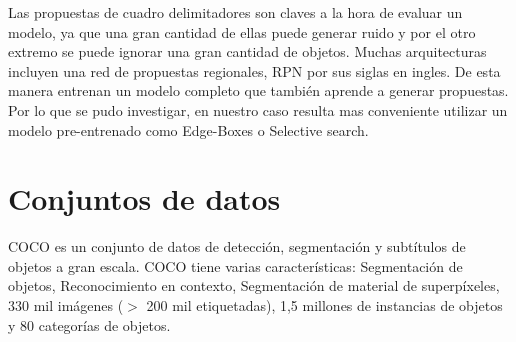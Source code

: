 Las propuestas de cuadro delimitadores son claves a la hora de evaluar un modelo, ya que una gran cantidad de ellas puede generar ruido y por el otro extremo se puede ignorar una gran cantidad de objetos.  Muchas arquitecturas incluyen una red de propuestas regionales, RPN por sus siglas en ingles. De esta manera entrenan un modelo completo que también aprende a generar propuestas. Por lo que se pudo investigar, en nuestro caso resulta mas conveniente utilizar un modelo pre-entrenado como Edge-Boxes o Selective search.

\section{Conjuntos de datos}
COCO es un conjunto de datos de detección, segmentación y subtítulos de objetos a gran escala. COCO tiene varias características: Segmentación de objetos,  Reconocimiento en contexto,  Segmentación de material de superpíxeles, 330 mil imágenes ($>$ 200 mil etiquetadas), 1,5 millones de instancias de objetos y 80 categorías de objetos.

